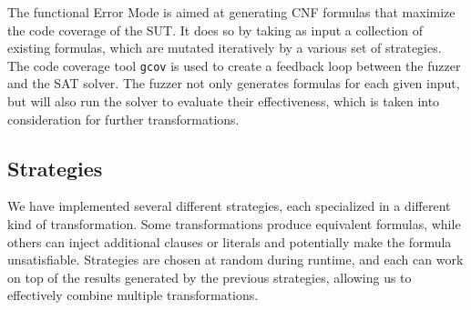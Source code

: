 \documentclass{article}
\begin{document}
The functional Error Mode is aimed at generating CNF formulas that maximize the code coverage of the SUT. 
It does so by taking as input a collection of existing formulas, which are mutated iteratively by a 
various set of strategies.\\

The code coverage tool \verb|gcov| is used to create a feedback loop between the fuzzer and the SAT solver.
The fuzzer not only generates formulas for each given input, but will also run the solver to evaluate
their effectiveness, which is taken into consideration for further transformations.

\subsection{Strategies}

We have implemented several different strategies, each specialized in a different kind of transformation.
Some transformations produce equivalent formulas, while others can inject additional clauses or literals
and potentially make the formula unsatisfiable.
Strategies are chosen at random during runtime, and each can work on top of the results generated by the
previous strategies, allowing us to effectively combine multiple transformations. \\
\end{document}

